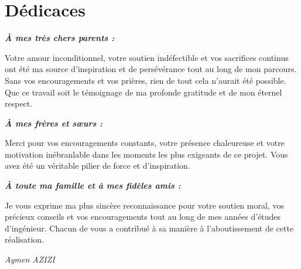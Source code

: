 
\chapter*{\Huge D\'edicaces}
\vspace{20mm}

\begin{center}
\textbf{\textit{\`A mes tr\`es chers parents :}}

\vspace{5mm}
Votre amour inconditionnel, votre soutien ind\'efectible et vos sacrifices continus ont \'et\'e ma source d'inspiration et de pers\'ev\'erance tout au long de mon parcours. Sans vos encouragements et vos pri\`eres, rien de tout cela n'aurait \'et\'e possible. Que ce travail soit le t\'emoignage de ma profonde gratitude et de mon \'eternel respect.

\vspace{10mm}
\textbf{\textit{\`A mes fr\`eres et s\oe urs :}}

\vspace{5mm}
Merci pour vos encouragements constants, votre pr\'esence chaleureuse et votre motivation in\'ebranlable dans les moments les plus exigeants de ce projet. Vous avez \'et\'e un v\'eritable pilier de force et d'inspiration.

\vspace{10mm}
\textbf{\textit{\`A toute ma famille et \`a mes fid\`eles amis :}}

\vspace{5mm}
Je vous exprime ma plus sinc\`ere reconnaissance pour votre soutien moral, vos pr\'ecieux conseils et vos encouragements tout au long de mes ann\'ees d'\'etudes d'ing\'enieur. Chacun de vous a contribu\'e \`a sa mani\`ere \`a l'aboutissement de cette r\'ealisation.

\end{center}

\vspace{8mm}
\vspace{8mm}
\begin{flushright}
    \LARGE \textit{Aymen AZIZI}
\end{flushright}
